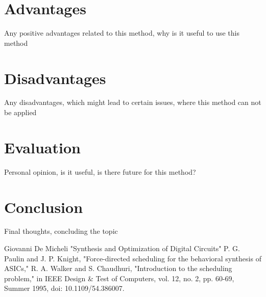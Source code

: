 \documentclass[conference]{IEEEtran}
\begin{document}
\section{Advantages}
Any positive advantages related to this method, why is it useful to use this method

\section{Disadvantages}
Any disadvantages, which might lead to certain issues, where this method can not be applied

\section{Evaluation}
Personal opinion, is it useful, is there future for this method?

\section{Conclusion}
Final thoughts, concluding the topic

\begin{thebibliography}{00}
Giovanni De Micheli "Synthesis and Optimization of Digital Circuits"
P. G. Paulin and J. P. Knight, "Force-directed scheduling for the behavioral synthesis of ASICs,"
\bibitem[b3]{}
R. A. Walker and S. Chaudhuri, "Introduction to the scheduling problem," in IEEE Design & Test of Computers, vol. 12, no. 2, pp. 60-69, Summer 1995, doi: 10.1109/54.386007.
\end{thebibliography}
\end{document}

